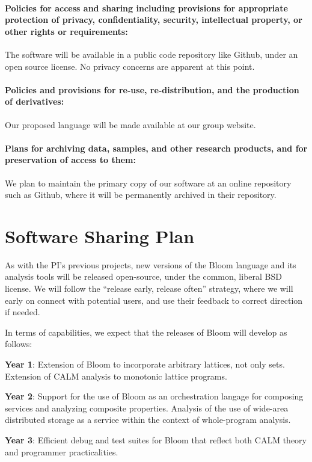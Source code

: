 \paragraph{Policies for access and sharing including provisions for
  appropriate protection of privacy, confidentiality, security,
  intellectual property, or other rights or requirements:}  The
software will be available in a public code repository like Github, under an open source license.  No privacy concerns are apparent at this point.

\paragraph{Policies and provisions for re-use, re-distribution, and
  the production of derivatives:} Our proposed language will be made
available at our group website. 

\paragraph{Plans for archiving data, samples, and other research
  products, and for preservation of access to them:}  We plan to
maintain the primary copy of our software at an online repository such as Github, where it will be permanently archived in their repository.  


\section*{Software Sharing Plan}

As with the PI's previous projects, new versions of the Bloom language and its analysis tools will be
released open-source, under the common, liberal BSD license.  We will follow the ``release early, release often''
strategy, where we will early on connect with potential users, and use
their feedback to correct direction if needed.  

In terms of capabilities, we expect that the releases of Bloom will develop as follows: 
\begin{tightitemize}
\item\textbf{Year 1}: Extension of Bloom to incorporate arbitrary lattices, not only sets.  Extension of CALM analysis to monotonic lattice programs.

\item\textbf{Year 2}: Support for the use of Bloom as an orchestration langage for composing services and analyzing composite properties.  Analysis of the use of wide-area distributed storage as a service within the context of whole-program analysis.

\item\textbf{Year 3}: Efficient debug and test suites for Bloom that reflect both CALM theory and programmer practicalities.
\end{tightitemize}


